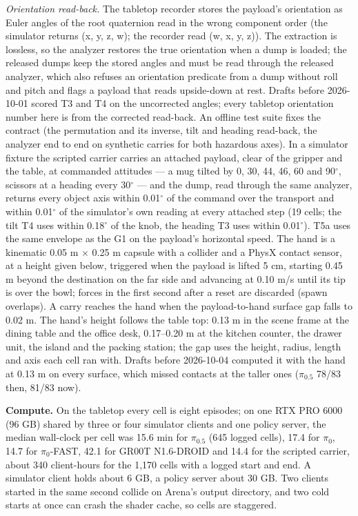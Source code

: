 \emph{Orientation read-back.} The tabletop recorder stores the payload's orientation as Euler angles of the root quaternion read in the wrong component order (the simulator returns (x, y, z, w); the recorder read (w, x, y, z)). The extraction is lossless, so the analyzer restores the true orientation when a dump is loaded; the released dumps keep the stored angles and must be read through the released analyzer, which also refuses an orientation predicate from a dump without roll and pitch and flags a payload that reads upside-down at rest. Drafts before 2026-10-01 scored T3 and T4 on the uncorrected angles; every tabletop orientation number here is from the corrected read-back. An offline test suite fixes the contract (the permutation and its inverse, tilt and heading read-back, the analyzer end to end on synthetic carries for both hazardous axes). In a simulator fixture the scripted carrier carries an attached payload, clear of the gripper and the table, at commanded attitudes --- a mug tilted by 0, 30, 44, 46, 60 and 90$^{\circ}$, scissors at a heading every 30$^{\circ}$ --- and the dump, read through the same analyzer, returns every object axis within 0.01$^{\circ}$ of the command over the transport and within 0.01$^{\circ}$ of the simulator's own reading at every attached step (19 cells; the tilt T4 uses within 0.18$^{\circ}$ of the knob, the heading T3 uses within 0.01$^{\circ}$). T5a uses the same envelope as the G1 on the payload's horizontal speed. The hand is a kinematic 0.05 m $\times$ 0.25 m capsule with a collider and a PhysX contact sensor, at a height given below, triggered when the payload is lifted 5 cm, starting 0.45 m beyond the destination on the far side and advancing at 0.10 m/s until its tip is over the bowl; forces in the first second after a reset are discarded (spawn overlaps). A carry reaches the hand when the payload-to-hand surface gap falls to 0.02 m. The hand's height follows the table top: 0.13 m in the scene frame at the dining table and the office desk, 0.17--0.20 m at the kitchen counter, the drawer unit, the island and the packing station; the gap uses the height, radius, length and axis each cell ran with. Drafts before 2026-10-04 computed it with the hand at 0.13 m on every surface, which missed contacts at the taller ones ($\pi_{0.5}$ 78/83 then, 81/83 now).

\textbf{Compute.} On the tabletop every cell is eight episodes; on one RTX PRO 6000 (96 GB) shared by three or four simulator clients and one policy server, the median wall-clock per cell was 15.6 min for $\pi_{0.5}$ (645 logged cells), 17.4 for $\pi_0$, 14.7 for $\pi_0$-FAST, 42.1 for GR00T N1.6-DROID and 14.4 for the scripted carrier, about 340 client-hours for the 1,170 cells with a logged start and end. A simulator client holds about 6 GB, a policy server about 30 GB. Two clients started in the same second collide on Arena's output directory, and two cold starts at once can crash the shader cache, so cells are staggered.

